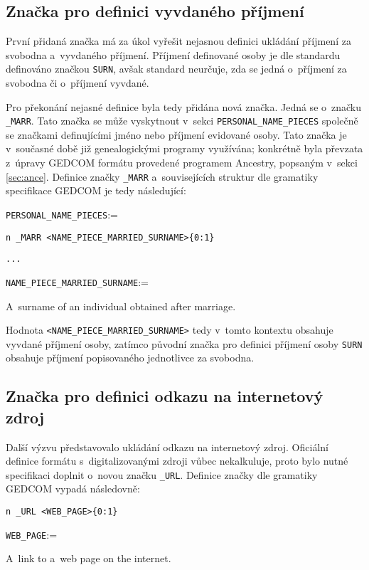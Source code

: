 		\subsection*{Značka pro definici vyvdaného příjmení}
		První přidaná značka má za úkol vyřešit nejasnou definici ukládání příjmení za svobodna a~vyvdaného příjmení. Příjmení definované osoby je dle standardu definováno značkou \verb|SURN|, avšak standard neurčuje, zda se jedná o~příjmení za svobodna či o~příjmení vyvdané. \par
		Pro překonání nejasné definice byla tedy přidána nová značka. Jedná se o~značku \verb|_MARR|. Tato značka se může vyskytnout v~sekci \verb|PERSONAL_NAME_PIECES| společně se značkami definujícími jméno nebo příjmení evidované osoby. 
		Tato značka je v~současné době již genealogickými programy využívána; konkrétně byla převzata z~úpravy GEDCOM formátu provedené programem Ancestry, popsaným v~sekci \ref{sec:ance}. Definice značky \verb|_MARR| a~souvisejících struktur dle gramatiky specifikace GEDCOM je tedy následující:\par
		\vspace{1em}
		\verb|PERSONAL_NAME_PIECES|:=\par
		\quad \verb|n _MARR <NAME_PIECE_MARRIED_SURNAME>|\hfill\verb|{0:1}|\par
		\quad \verb|...|\par
		\vspace{1em}
		\verb|NAME_PIECE_MARRIED_SURNAME|:=\par
		\quad A~surname of an individual obtained after marriage.
		\vspace{1em}
		
		Hodnota \verb|<NAME_PIECE_MARRIED_SURNAME>| tedy v~tomto kontextu obsahuje vyvdané příjmení osoby, zatímco původní značka pro definici příjmení osoby \verb|SURN| obsahuje příjmení popisovaného jednotlivce za svobodna. \par

		\subsection*{Značka pro definici odkazu na internetový zdroj}
		Další výzvu představovalo ukládání odkazu na internetový zdroj. Oficiální definice formátu s~digitalizovanými zdroji vůbec nekalkuluje, proto bylo nutné specifikaci doplnit o~novou značku \verb|_URL|. Definice značky dle gramatiky GEDCOM vypadá následovně:\par
		\vspace{1em}
		\verb|n _URL <WEB_PAGE>|\hfill\verb|{0:1}|\par
		\vspace{1em}
		\verb|WEB_PAGE|:=\par
		\quad A~link to a~web page on the internet.
		\vspace{1em}
		
